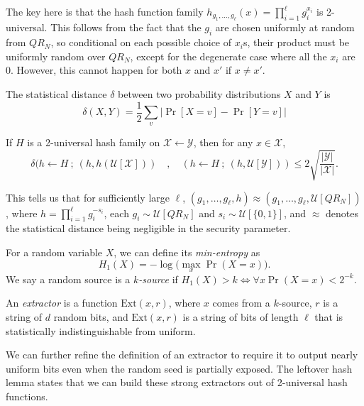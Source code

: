 \documentclass[10pt]{article}
\newcommand{\bit}{\{0,1\}}
\newcommand{\unif}[1]{\mathcal{U}\left[{#1}\right]}
\newcommand{\then}{\ ;\ }
\begin{document}
The key here is that the hash function family $h_{g_1,\dots,g_\ell}(x) = \prod_{i=1}^\ell g_i ^ {x_i}$ is 2-universal. This follows from the fact that the $g_i$ are chosen uniformly at random from $QR_N$, so conditional on each possible choice of $x_i$s, their product must be uniformly random over $QR_N$, except for the degenerate case where all the $x_i$ are $0$. However, this cannot happen for both $x$ and $x'$ if $x \neq x'$.

\begin{definition}

The statistical distance $\delta$  between two probability distributions $X$ and $Y$ is
\[
    \delta(X,Y) = \frac{1}{2} \sum_v | \Pr[X = v] - \Pr[Y = v] |
\]

\end{definition}

\begin{lemma}
If $H$ is a 2-universal hash family on $\mathcal{X} \leftarrow \mathcal{Y}$, then for any $x \in \mathcal{X}$,
\[
\delta(h \leftarrow H \then (h,h(\unif{\mathcal{X}})) \quad, \quad 
         (h \leftarrow H \then (h,\unif{\mathcal{Y}})) \le 2\sqrt{\frac{|\mathcal{Y}|}{|\mathcal{X}|}}.
\]
\end{lemma}

This tells us that for sufficiently large $\ell$, $(g_1,\dots,g_\ell,h) \approx (g_1,\dots,g_\ell,\unif{QR_N})$, where $h = \prod_{i=1}^\ell g_i^{-s_i}$, each $g_i \sim \unif{QR_N}$ and $s_i \sim \unif{\bit}$, and $\approx$ denotes the statistical distance being negligible in the security parameter.

\begin{definition}
For a random variable $X$, we can define its \emph{min-entropy} as 
\[
H_1(X) = -\log \big( \max_x \Pr(X = x) \big).
\]
We say a random source is a \emph{$k$-source} if $H_1(X) > k \iff \forall x \Pr(X = x) < 2^{-k}$.
\end{definition}

\begin{definition}
An \emph{extractor} is a function $\mathrm{Ext}(x,r)$, where $x$ comes from a $k$-source, $r$ is a string of $d$ random bits, and $\mathrm{Ext}(x,r)$ is a string of bits of length $\ell$ that is statistically indistinguishable from uniform.
\end{definition}

We can further refine the definition of an extractor to require it to output nearly uniform bits even when the random seed is partially exposed. The leftover hash lemma states that we can build these strong extractors out of 2-universal hash functions.
\end{document}
